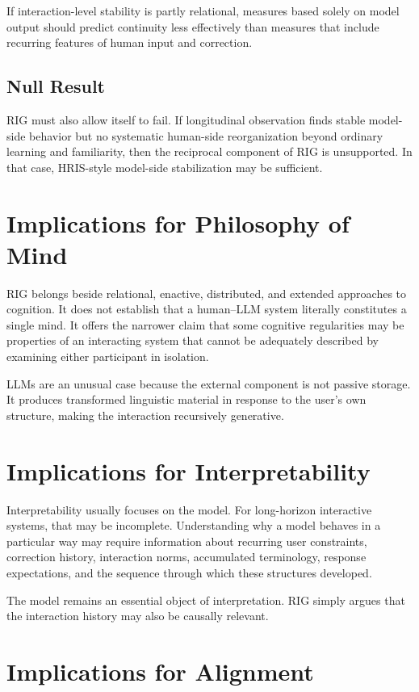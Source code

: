 \documentclass[12pt]{article}
\begin{document}
If interaction-level stability is partly relational, measures based solely on model output should predict continuity less effectively than measures that include recurring features of human input and correction.

\subsection{Null Result}

RIG must also allow itself to fail. If longitudinal observation finds stable model-side behavior but no systematic human-side reorganization beyond ordinary learning and familiarity, then the reciprocal component of RIG is unsupported. In that case, HRIS-style model-side stabilization may be sufficient.

\section{Implications for Philosophy of Mind}

RIG belongs beside relational, enactive, distributed, and extended approaches to cognition. It does not establish that a human--LLM system literally constitutes a single mind. It offers the narrower claim that some cognitive regularities may be properties of an interacting system that cannot be adequately described by examining either participant in isolation.

LLMs are an unusual case because the external component is not passive storage. It produces transformed linguistic material in response to the user's own structure, making the interaction recursively generative.

\section{Implications for Interpretability}

Interpretability usually focuses on the model. For long-horizon interactive systems, that may be incomplete. Understanding why a model behaves in a particular way may require information about recurring user constraints, correction history, interaction norms, accumulated terminology, response expectations, and the sequence through which these structures developed.

The model remains an essential object of interpretation. RIG simply argues that the interaction history may also be causally relevant.

\section{Implications for Alignment}
\end{document}
